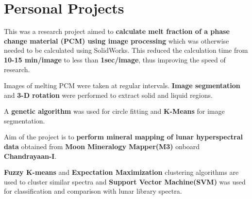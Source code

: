 \documentclass[]{deedy-resume-openfont}
\begin{document}
\begin{minipage}[t]{0.66\textwidth}

\section{Personal Projects}

\begin{tightemize}
\item This was a research project aimed to \textbf{calculate melt fraction of a phase change material (PCM) using image processing} which was otherwise needed to be calculated using SolidWorks. This reduced the calculation time from \textbf{10-15 min/image} to less than \textbf{1sec/image}, thus improving the speed of research.
\item Images of melting PCM were taken at regular intervals. \textbf{Image segmentation} and \textbf{3-D rotation} were performed to extract solid and liquid regions.
\item A \textbf{genetic algorithm} was used for circle fitting and \textbf{K-Means} for image segmentation.
\end{tightemize}
\sectionsep

\begin{tightemize}
\item Aim of the project is to \textbf{perform mineral mapping of lunar hyperspectral data} obtained from \textbf{Moon Mineralogy Mapper(M3)} onboard \textbf{Chandrayaan-I}.
\item \textbf{Fuzzy K-means} and \textbf{Expectation Maximization} clustering algorithms are used to cluster similar spectra and \textbf{Support Vector Machine(SVM)} was used for classification and comparison with lunar library spectra.
\end{tightemize}
\sectionsep

\end{minipage}
\end{document}
